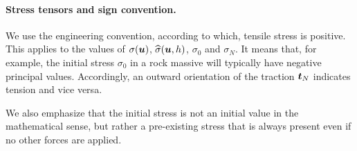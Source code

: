 \paragraph{Stress tensors and sign convention.}
We use the engineering convention, according to which, tensile stress is positive.
This applies to the values of $\sigma(\mathbf{\boldsymbol{u}})$, $\widehat\sigma(\mathbf{\boldsymbol{u}},h)$, $\sigma_0$ and $\sigma_N$.
It means that, for example, the initial stress $\sigma_0$ in a rock massive will typically have negative principal values.
Accordingly, an outward orientation of the traction $\mathbf{\boldsymbol{t}}_N$ indicates tension and vice versa.

We also emphasize that the initial stress is not an initial value in the mathematical sense, but rather a pre-existing stress that is always present even if no other forces are applied.